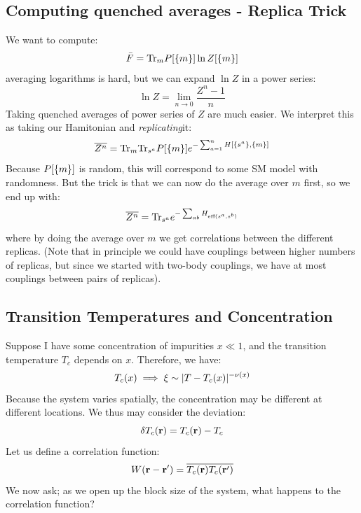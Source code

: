 \subsection{Computing quenched averages - Replica Trick}
We want to compute:
\begin{equation}
    \bar{F} = \mathrm{Tr}_m P[\set{m}]\ln Z[\set{m}]
\end{equation}
averaging logarithms is hard, but we can expand $\ln Z$ in a power series:
\begin{equation}
    \ln Z = \lim_{n \to 0}\frac{Z^n - 1}{n}
\end{equation}
Taking quenched averages of power series of $Z$ are much easier. We interpret this as taking our Hamitonian and \emph{replicating}it:
\begin{equation}
    \overline{Z^n} = \mathrm{Tr}_m \mathrm{Tr}_{s^a} P[\set{m}] e^{-\sum_{a=1}^n H[\set{s^a}, \set{m}]}
\end{equation}
Because $P[\set{m}]$ is random, this will correspond to some SM model with randomness. But the trick is that we can now do the average over $m$ first, so we end up with:
\begin{equation}
    \overline{Z^n} = \mathrm{Tr}_{s^a}e^{-\sum_{ab}H_{\text{eff}(s^a, s^b)}}
\end{equation}
where by doing the average over $m$ we get correlations between the different replicas. (Note that in principle we could have couplings between higher numbers of replicas, but since we started with two-body couplings, we have at most couplings between pairs of replicas).

\subsection{Transition Temperatures and Concentration}
Suppose I have some concentration of impurities $x \ll 1$, and the transition temperature $T_c$ depends on $x$. Therefore, we have:
\begin{equation}
    T_c(x) \implies \xi \sim \lvert T - T_c(x) \rvert^{-\nu(x)}
\end{equation}
Because the system varies spatially, the concentration may be different at different locations. We thus may consider the deviation:
\begin{equation}
    \delta T_c(\mathbf{r}) = T_c(\mathbf{r}) - T_c
\end{equation}
Let us define a correlation function:
\begin{equation}
    W(\mathbf{r} - \mathbf{r}') = \overline{T_c(\mathbf{r})T_c(\mathbf{r}')}
\end{equation}
We now ask; as we open up the block size of the system, what happens to the correlation function?

